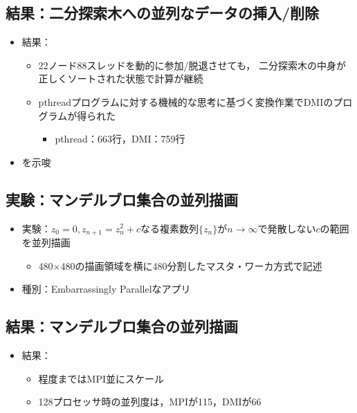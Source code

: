 \documentclass[25pt,landscape,papersize]{jsarticle}
\begin{document}

\subsection{結果：二分探索木への並列なデータの挿入/削除}

\begin{itemize}
\item 結果：
  \begin{itemize}
  \item 22ノード88スレッドを動的に参加/脱退させても，
    二分探索木の中身が正しくソートされた状態で計算が継続
  \item pthreadプログラムに対する機械的な思考に基づく変換作業でDMIのプログラムが得られた
    \begin{itemize}
    \item pthread：663行，DMI：759行
    \end{itemize}
  \end{itemize}
\item {}を示唆
\end{itemize}

\subsection{実験：マンデルブロ集合の並列描画}

\begin{itemize}
\item 実験：$z_0=0,z_{n+1}=z_n^2+c$なる複素数列$\{z_n\}$が$n\to\infty$で発散しない$c$の範囲を並列描画
  \begin{itemize}
  \item 480$\times$480の描画領域を横に480分割したマスタ・ワーカ方式で記述
  \end{itemize}
\item 種別：Embarrassingly Parallelなアプリ
\end{itemize}


\subsection{結果：マンデルブロ集合の並列描画}

\begin{itemize}
\item 結果：
  \begin{itemize}
  \item {}程度まではMPI並にスケール
  \item 128プロセッサ時の並列度は，MPIが115，DMIが66
  \end{itemize}
\end{itemize}
\end{document}
